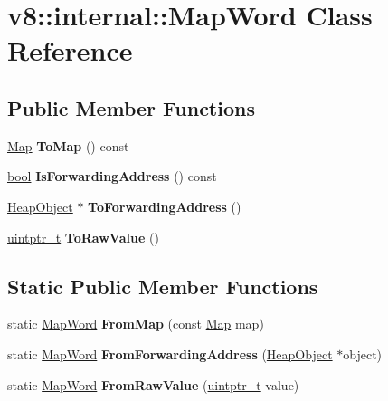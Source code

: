 \hypertarget{classv8_1_1internal_1_1MapWord}{}\section{v8\+:\+:internal\+:\+:Map\+Word Class Reference}
\label{classv8_1_1internal_1_1MapWord}
\subsection*{Public Member Functions}
\begin{DoxyCompactItemize}
\item 
\mbox{\label{classv8_1_1internal_1_1MapWord_ad7d9c08b99e8aed696f648305b399bcc}} 
\mbox{\hyperlink{classv8_1_1internal_1_1Map}{Map}} {\bfseries To\+Map} () const
\item 
\mbox{\label{classv8_1_1internal_1_1MapWord_a9dca2a41d176b2abbd067e956796a439}} 
\mbox{\hyperlink{classbool}{bool}} {\bfseries Is\+Forwarding\+Address} () const
\item 
\mbox{\label{classv8_1_1internal_1_1MapWord_a25067e3131549146febea9ab022c721e}} 
\mbox{\hyperlink{classv8_1_1internal_1_1HeapObject}{Heap\+Object}} $\ast$ {\bfseries To\+Forwarding\+Address} ()
\item 
\mbox{\label{classv8_1_1internal_1_1MapWord_a8486bad0073950d15d340ccb7a348f4c}} 
\mbox{\hyperlink{classuintptr__t}{uintptr\+\_\+t}} {\bfseries To\+Raw\+Value} ()
\end{DoxyCompactItemize}
\subsection*{Static Public Member Functions}
\begin{DoxyCompactItemize}
\item 
\mbox{\label{classv8_1_1internal_1_1MapWord_aade16519a17f4848d8e133bd62f54ac7}} 
static \mbox{\hyperlink{classv8_1_1internal_1_1MapWord}{Map\+Word}} {\bfseries From\+Map} (const \mbox{\hyperlink{classv8_1_1internal_1_1Map}{Map}} map)
\item 
\mbox{\label{classv8_1_1internal_1_1MapWord_a111fb02f9507ceedaf0bf03656b35246}} 
static \mbox{\hyperlink{classv8_1_1internal_1_1MapWord}{Map\+Word}} {\bfseries From\+Forwarding\+Address} (\mbox{\hyperlink{classv8_1_1internal_1_1HeapObject}{Heap\+Object}} $\ast$object)
\item 
\mbox{\label{classv8_1_1internal_1_1MapWord_a7b7d8e28a61cc5ecf641e5c026dd8833}} 
static \mbox{\hyperlink{classv8_1_1internal_1_1MapWord}{Map\+Word}} {\bfseries From\+Raw\+Value} (\mbox{\hyperlink{classuintptr__t}{uintptr\+\_\+t}} value)
\end{DoxyCompactItemize}
